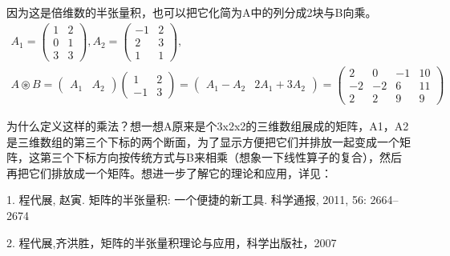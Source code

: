 	因为这是倍维数的半张量积，也可以把它化简为A中的列分成2块与B向乘。
	\begin{gather*}
		A_1=\begin{pmatrix}1 & 2 \\ 0 & 1 \\  3&  3\end{pmatrix}, A_2=\begin{pmatrix} -1& 2\\ 2& 3\\ 1& 1\end{pmatrix},\\
		A\circledast B =\begin{pmatrix}A_1 & A_2\end{pmatrix}\begin{pmatrix}1 &2 \\-1&3\end{pmatrix}=\begin{pmatrix}A_1-A_2 & 2A_1+3A_2\end{pmatrix}=\begin{pmatrix}2 & 0 & -1& 10\\ -2 & -2 & 6& 11\\2& 2& 9& 9\end{pmatrix}		
	\end{gather*}

	为什么定义这样的乘法？想一想A原来是个3x2x2的三维数组展成的矩阵，A1，A2是三维数组的第三个下标的两个断面，为了显示方便把它们并排放一起变成一个矩阵，这第三个下标方向按传统方式与B来相乘（想象一下线性算子的复合），然后再把它们排放成一个矩阵。想进一步了解它的理论和应用，详见：
	
	1. 程代展, 赵寅. 矩阵的半张量积: 一个便捷的新工具. 科学通报, 2011, 56: 2664–2674
	
	2. 程代展,齐洪胜，矩阵的半张量积理论与应用，科学出版社，2007